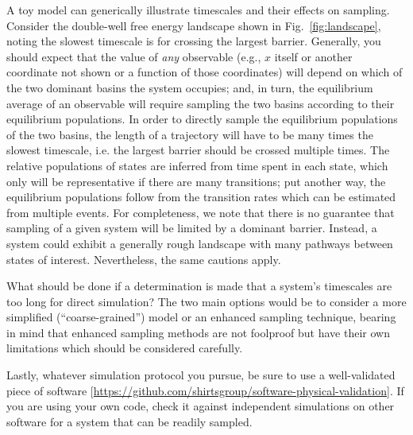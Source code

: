 A toy model can generically illustrate timescales and their effects on sampling.
Consider the double-well free energy landscape shown in Fig.\ \ref{fig:landscape}, noting the slowest timescale is for crossing the largest barrier.
Generally, you should expect that the value of \emph{any} observable (e.g., $x$ itself or another coordinate not shown or a function of those coordinates) will depend on which of the two dominant basins the system occupies; and, in turn, the equilibrium average of an observable will require sampling the two basins according to their equilibrium populations.
In order to directly sample the equilibrium populations of the two basins, the length of a trajectory will have to be many times the slowest timescale, i.e. the largest barrier should be crossed multiple times.
The relative populations of states are inferred from time spent in each state, which only will be representative if there are many transitions;
put another way, the equilibrium populations follow from the transition rates \cite{Zuckerman2011} which can be estimated from multiple events.
For completeness, we note that there is no guarantee that sampling of a given system will be limited by a dominant barrier.  
Instead, a system could exhibit a generally rough landscape with many pathways between states of interest.
Nevertheless, the same cautions apply.

What should be done if a determination is made that a system's timescales are too long for direct simulation?
The two main options would be to consider a more simplified (``coarse-grained'') model or an enhanced sampling technique, bearing in mind that enhanced sampling methods are not foolproof but have their own limitations which should be considered carefully.

Lastly, whatever simulation protocol you pursue, be sure to use a well-validated piece of software [\url{https://github.com/shirtsgroup/software-physical-validation}].
If you are using your own code, check it against independent simulations on other software for a system that can be readily sampled.

